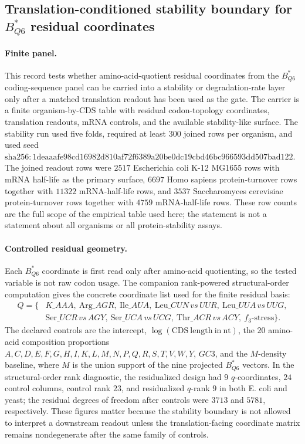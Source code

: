 \subsection{Translation-conditioned stability boundary for $B^*_{Q6}$ residual coordinates}\label{subsec:bioreality-q6-translation-conditioned-stability-boundary}

\paragraph{Finite panel.}
This record tests whether amino-acid-quotient residual coordinates from the $B^*_{Q6}$ coding-sequence panel can be carried into a stability or degradation-rate layer only after a matched translation readout has been used as the gate.  The carrier is a finite organism-by-CDS table with residual codon-topology coordinates, translation readouts, mRNA controls, and the available stability-like surface.  The stability run used five folds, required at least $300$ joined rows per organism, and used seed $\mathrm{sha256{:}1deaaafe98cd16982d810af72f6389a20be0dc19cbd46bc966593dd507bad122}$.  The joined readout rows were $2517$ Escherichia coli K-12 MG1655 rows with mRNA half-life as the primary surface, $6697$ Homo sapiens protein-turnover rows together with $11322$ mRNA-half-life rows, and $3537$ Saccharomyces cerevisiae protein-turnover rows together with $4759$ mRNA-half-life rows.  These row counts are the full scope of the empirical table used here; the statement is not a statement about all organisms or all protein-stability assays.

\paragraph{Controlled residual geometry.}
Each $B^*_{Q6}$ coordinate is first read only after amino-acid quotienting, so the tested variable is not raw codon usage.  The companion rank-powered structural-order computation gives the concrete coordinate list used for the finite residual basis:
$$
\begin{aligned}
Q=\{&K\_{AAA},\ \mathrm{Arg}\_{AGR},\ \mathrm{Ile}\_{AUA},\ \mathrm{Leu}\_{CUN\,vs\,UUR},\ \mathrm{Leu}\_{UUA\,vs\,UUG},\\
&\mathrm{Ser}\_{UCR\,vs\,AGY},\ \mathrm{Ser}\_{UCA\,vs\,UCG},\ \mathrm{Thr}\_{ACR\,vs\,ACY},\ f_3\text{-stress}\}.
\end{aligned}
$$
The declared controls are the intercept, $\log(\mathrm{CDS\ length\ in\ nt})$, the $20$ amino-acid composition proportions $A,C,D,E,F,G,H,I,K,L,M,N,P,Q,R,S,T,V,W,Y$, $GC3$, and the $M$-density baseline, where $M$ is the union support of the nine projected $B^*_{Q6}$ vectors.  In the structural-order rank diagnostic, the residualized design had $9$ $q$-coordinates, $24$ control columns, control rank $23$, and residualized $q$-rank $9$ in both E. coli and yeast; the residual degrees of freedom after controls were $3713$ and $5781$, respectively.  These figures matter because the stability boundary is not allowed to interpret a downstream readout unless the translation-facing coordinate matrix remains nondegenerate after the same family of controls.

